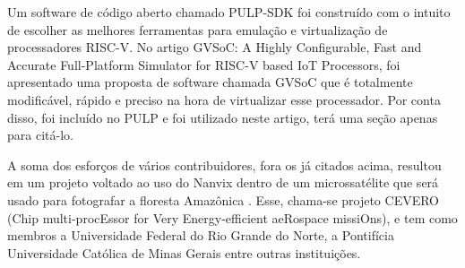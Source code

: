 Um software de código aberto chamado PULP-SDK foi construído com o intuito de escolher as melhores ferramentas para emulação e virtualização de processadores RISC-V. 
No artigo {GVSoC: A Highly Configurable, Fast and Accurate Full-Platform Simulator for RISC-V based IoT Processors}, foi apresentado uma proposta de software chamada
GVSoC que é totalmente modificável, rápido e preciso na hora de virtualizar esse processador. Por conta disso, foi incluído no PULP e foi utilizado neste artigo, terá
uma seção apenas para citá-lo.

A soma dos esforços de vários contribuidores, fora os já citados acima, resultou em um projeto voltado ao uso do Nanvix dentro de um microssatélite que será usado 
para fotografar a floresta Amazônica \cite{RepoCervero}. Esse, chama-se projeto CEVERO (Chip multi-procEssor for Very Energy-efficient aeRospace missiOns), e tem 
como membros a Universidade Federal do Rio Grande do Norte, a Pontifícia Universidade Católica de Minas Gerais entre outras instituições. 
